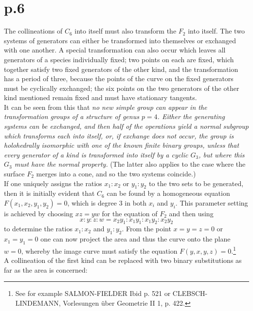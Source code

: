 \documentclass[leqno]{article}
\begin{document}
\section{p.6}
The collineations of $C_6$ into itself must also transform the $F_2$ into itself. The two systems of generators can either be transformed into themselves or exchanged with one another. A special transformation can also occur which leaves all generators of a species individually fixed; two points on each are fixed, which together satisfy two fixed generators of the other kind, and the transformation has a period of three, because the points of the curve on the fixed generators must be cyclically exchanged; the six points on the two generators of the other kind mentioned remain fixed and must have stationary tangents. \\
It can be seen from this that \textit{no new simple group can appear in the transformation groups of a structure of genus $ p = 4 $. Either the generating systems can be exchanged, and then half of the operations yield a normal subgroup which transforms each into itself, or, if exchange does not occur, the group is holohedrally isomorphic with one of the known finite binary groups, unless that every generator of a kind is transformed into itself by a cyclic $ G_3 $, but where this $ G_3 $ must have the normal property.} (The latter also applies to the case where the surface $ F_2 $ merges into a cone, and so the two systems coincide.)\\
If one uniquely assigns the ratios $ x_1: x_2 $ or $ y_1: y_2 $ to the two sets to be generated, then it is initially evident that $ C_6 $ can be found by a homogeneous equation $ F (x_1, x_2, y_1, y_2) = 0 $, which is degree 3 in both $ x_i $ and $ y_i $. This parameter setting is achieved by choosing $ xz = yw $ for the equation of $F_2$  and then using
\begin{equation}\label{eq: 2.1}
x: y : z : w = x_2y_1 :x_1 y_1 : x_1 y_2: x_2 y_2 \tag{1}
\end{equation}
to determine the ratios $ x_1: x_2 $ and $ y_1: y_2 $. From the point $ x = y = z = 0 $ or $ x_1 = y_1 = 0 $ one can now project the area and thus the curve onto the plane $ w = 0 $, whereby the image curve must satisfy the equation $F(y, x, y, z) = 0$.\footnote{See for example SALMON-FIELDER Ibid p. 521 or CLEBSCH-LINDEMANN, Vorlesungen \"uber Geometrie II 1, p. 422.} \\
A collineation of the first kind can be replaced with two binary substitutions as far as the area is concerned:
\end{document}
